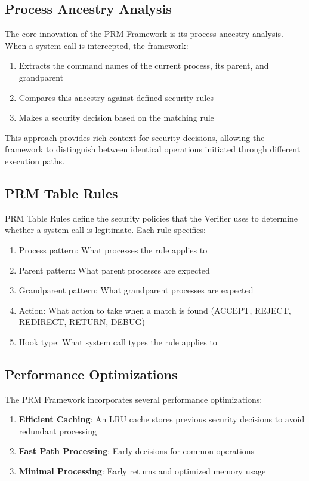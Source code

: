 \subsection{Process Ancestry Analysis}
The core innovation of the PRM Framework is its process ancestry analysis. When a system call is intercepted, the framework:

\begin{enumerate}
\item Extracts the command names of the current process, its parent, and grandparent
\item Compares this ancestry against defined security rules
\item Makes a security decision based on the matching rule
\end{enumerate}

This approach provides rich context for security decisions, allowing the framework to distinguish between identical operations initiated through different execution paths.

\subsection{PRM Table Rules}
PRM Table Rules define the security policies that the Verifier uses to determine whether a system call is legitimate. Each rule specifies:

\begin{enumerate}
\item Process pattern: What processes the rule applies to
\item Parent pattern: What parent processes are expected
\item Grandparent pattern: What grandparent processes are expected
\item Action: What action to take when a match is found (ACCEPT, REJECT, REDIRECT, RETURN, DEBUG)
\item Hook type: What system call types the rule applies to
\end{enumerate}

\subsection{Performance Optimizations}
The PRM Framework incorporates several performance optimizations:

\begin{enumerate}
\item \textbf{Efficient Caching}: An LRU cache stores previous security decisions to avoid redundant processing
\item \textbf{Fast Path Processing}: Early decisions for common operations
\item \textbf{Minimal Processing}: Early returns and optimized memory usage
\end{enumerate}

